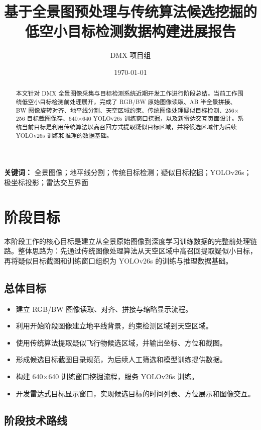 \documentclass[UTF8,a4paper,12pt]{ctexart}
\title{基于全景图预处理与传统算法候选挖掘的低空小目标检测数据构建进展报告}
\author{DMX 项目组}
\date{\today}
\begin{document}
\maketitle

\begin{abstract}
本文针对 DMX 全景图像采集与目标检测系统近期开发工作进行阶段总结。当前工作围绕低空小目标检测前处理展开，完成了 RGB/BW 原始图像读取、AB 半全景拼接、BW 图像旋转对齐、地平线分割、天空区域约束、传统图像处理疑似目标检测、256$\times$256 目标截图保存、640$\times$640 YOLOv26s 训练窗口挖掘，以及新雷达交互页面设计。系统当前目标是利用传统算法以高召回方式提取疑似目标区域，并将候选区域作为后续 YOLOv26s 训练和推理的数据基础。
\end{abstract}

\noindent\textbf{关键词：} 全景图像；地平线分割；传统目标检测；疑似目标挖掘；YOLOv26s；极坐标投影；雷达交互界面

\tableofcontents
\newpage

\section{阶段目标}

本阶段工作的核心目标是建立从全景原始图像到深度学习训练数据的完整前处理链路。整体思路为：先通过传统图像处理算法从天空区域中高召回提取疑似小目标，再将疑似目标截图和训练窗口组织为 YOLOv26s 的训练与推理数据基础。

\subsection{总体目标}

\begin{itemize}
  \item 建立 RGB/BW 图像读取、对齐、拼接与缩略显示流程。
  \item 利用开始阶段图像建立地平线背景，约束检测区域到天空区域。
  \item 使用传统算法提取疑似飞行物候选区域，并输出坐标、方位和截图。
  \item 形成候选目标截图目录规范，为后续人工筛选和模型训练提供数据。
  \item 构建 640$\times$640 训练窗口挖掘流程，服务 YOLOv26s 训练。
  \item 开发雷达式目标显示窗口，实现候选目标的时间列表、方位展示和图像交互。
\end{itemize}

\subsection{阶段技术路线}
\end{document}
